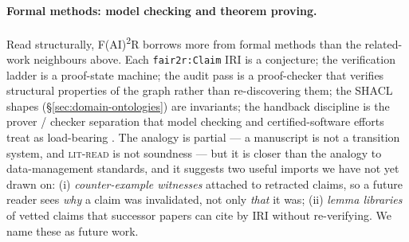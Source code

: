 \paragraph{Formal methods: model checking and theorem proving.}
Read structurally, F(AI)\textsuperscript{2}R borrows more from
formal methods than the related-work neighbours above. Each
\texttt{fair2r:Claim} IRI is a conjecture; the verification ladder
is a proof-state machine; the audit pass is a proof-checker that
verifies structural properties of the graph rather than
re-discovering them; the SHACL shapes (\S\ref{sec:domain-ontologies})
are invariants; the handback discipline is the prover / checker
separation that model checking and certified-software efforts
treat as load-bearing
\cite{clarke2009modelchecking,klein2009sel4}.
The analogy is partial --- a manuscript is not a transition system,
and \textsc{lit-read} is not soundness --- but it is closer than
the analogy to data-management standards, and it suggests two
useful imports we have not yet drawn on: (i) \emph{counter-example
witnesses} attached to retracted claims, so a future reader sees
\emph{why} a claim was invalidated, not only \emph{that} it was;
(ii) \emph{lemma libraries} of vetted claims that successor papers
can cite by IRI without re-verifying. We name these as future work.
